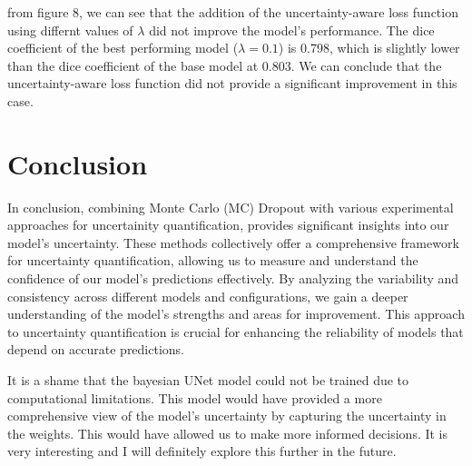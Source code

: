 \documentclass{article}
\begin{document}
from figure 8, we can see that the addition of the uncertainty-aware loss function using differnt values of \(\lambda\)
did not improve the model's performance. The dice coefficient of the best performing model (\(\lambda = 0.1\)) is 0.798, 
which is slightly lower than the dice coefficient of the base model at 0.803. We can conclude that the uncertainty-aware
loss function did not provide a significant improvement in this case.


\section{Conclusion}

In conclusion, combining Monte Carlo (MC) Dropout with various experimental approaches for uncertainity quantification, 
provides significant insights into our model's uncertainty. These methods collectively offer a comprehensive framework 
for uncertainty quantification, allowing us to measure and understand the confidence of our model's predictions 
effectively. By analyzing the variability and consistency across different models and configurations, we gain a deeper 
understanding of the model's strengths and areas for improvement. This approach to uncertainty quantification is crucial 
for enhancing the reliability of models that depend on accurate predictions.
\vspace{1em}

It is a shame that the bayesian UNet model could not be trained due to computational limitations. This model would have
provided a more comprehensive view of the model's uncertainty by capturing the uncertainty in the weights. 
This would have allowed us to make more informed decisions. It is very interesting and I will definitely 
explore this further in the future.
\end{document}

